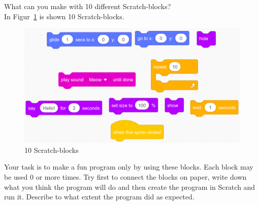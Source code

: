 What can you make with 10 different Scratch-blocks?\\
In Figur~\ref{fig:blokke} is shown 10 Scratch-blocks.
\begin{figure}
  \centering
  \includegraphics[width=0.9\linewidth]{figures/Scratch3.png}
  \caption{10 Scratch-blocks}
  \label{fig:blokke}
\end{figure}
Your task is to make a fun program only by using these blocks. Each
block may be used 0 or more times. Try first to connect the blocks on
paper, write down what you think the program will do and then create the
program in Scratch and run it. Describe to what extent the
program did as expected.
